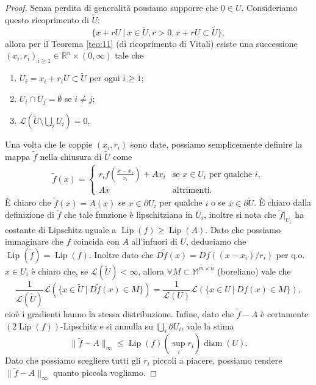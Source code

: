 \documentclass[a4paper,11pt]{book}
\theoremstyle{plain}
\theoremstyle{definition}
\theoremstyle{remark}
\newcommand{\R}{\mathbb{R}}
\newcommand{\M}{\mathbb{M}}
\newcommand{\LL}{\mathscr{L}}
\newcommand{\norm}[1]{\lVert#1\rVert}
\DeclareMathOperator{\Lip}{Lip}
\DeclareMathOperator{\diam}{diam}
\begin{document}
\begin{proof}
	Senza perdita di generalità possiamo supporre che $0\in U$. Consideriamo questo ricoprimento di $\widetilde{U}$:
	\[
		\{x+rU\ |\ x\in\widetilde{U}, r>0, x+rU\subset\widetilde{U}\},
	\]	
	allora per il Teorema \ref{teo:11} (di ricoprimento di Vitali) esiste una successione $(x_i,r_i)_{i\geq 1}\in \R^n\times (0,\infty)$ tale che
	\begin{enumerate}
		\item $U_i=x_i+r_iU\subset \widetilde{U}$ per ogni $i\geq 1$;
		\item $U_i\cap U_j=\emptyset$ se $i\neq j$;
		\item $\LL(\widetilde{U}\setminus\bigcup_i U_i) = 0$.
	\end{enumerate}
	Una volta che le coppie $(x_i,r_i)$ sono date, possiamo semplicemente definire la mappa $\widetilde{f}$ nella chiusura di $\widetilde{U}$ come
	\begin{align*}
		\widetilde{f}(x) = \begin{cases}
		                   	r_if(\frac{x-x_i}{r_i})+Ax_i&\text{se }x\in U_i\text{ per qualche }i,\\
		                   	Ax&\text{altrimenti}.
		                   \end{cases}
	\end{align*}	
	È chiaro che $\widetilde{f}(x) = A(x)$ se $x\in\partial U_i$ per qualche $i$ o se $x\in\partial\widetilde{U}$. È chiaro dalla definizione di $\widetilde{f}$ che tale funzione è lipschitziana in $\overline{U}_i$, inoltre si nota che $\widetilde{f}|_{U_i}$ ha costante di Lipschitz uguale a $\Lip(f) \geq \Lip(A)$. Dato che possiamo immaginare che $f$ coincida con $A$ all'infuori di $U$, deduciamo che $\Lip(\widetilde{f})=\Lip(f)$. Inoltre dato che $D\widetilde{f}(x) = Df((x-x_i)/r_i)$ per q.o. $x\in U_i$ è chiaro che, se $\LL(\widetilde{U})<\infty$, allora $\forall M\subset \M^{m\times n}$ (boreliano) vale che
	\[
		\frac{1}{\LL(\widetilde{U})}\LL(\{x\in\widetilde{U}\ |\ D\widetilde{f}(x)\in M\}) = \frac{1}{\LL(U)}\LL(\{x\in U\ |\ Df(x)\in M\}),
	\]
	cioè i gradienti hanno la stessa distribuzione. %
	Infine, dato che $\widetilde{f}-A$ è certamente $(2\Lip(f))$-Lipschitz e si annulla su $\bigcup_i \partial U_i$, vale la stima
	\[
		\norm{\widetilde{f}-A}_{\infty}\leq \Lip(f)(\sup_ir_i)\diam(U).{}
	\]
	Dato che possiamo scegliere tutti gli $r_i$ piccoli a piacere, possiamo rendere $\norm{\widetilde{f}-A}_{\infty}$ quanto piccola vogliamo.
\end{proof}
\end{document}
